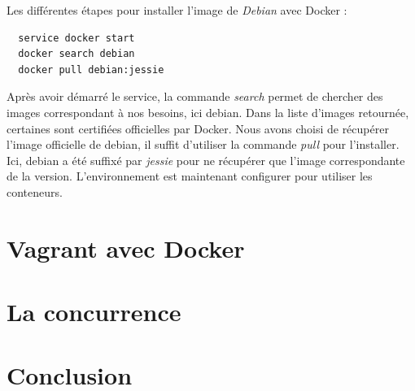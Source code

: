 \documentclass[12pt,a4paper]{article}
\begin{document}
Les différentes étapes pour installer l'image de \textit{Debian} avec Docker :
\begin{lstlisting}
  service docker start
  docker search debian
  docker pull debian:jessie
\end{lstlisting}

Après avoir démarré le service, la commande \textit{search} permet de chercher des images correspondant à nos besoins, ici debian. Dans la liste d'images retournée, certaines sont certifiées officielles par Docker. Nous avons choisi de récupérer l'image officielle de debian, il suffit d'utiliser la commande \textit{pull} pour l'installer. Ici, debian a été suffixé par \textit{jessie} pour ne récupérer que l'image correspondante de la version. L'environnement est maintenant configurer pour utiliser les conteneurs.

\section{Vagrant avec Docker}

\section{La concurrence}

\section{Conclusion}
\end{document}
